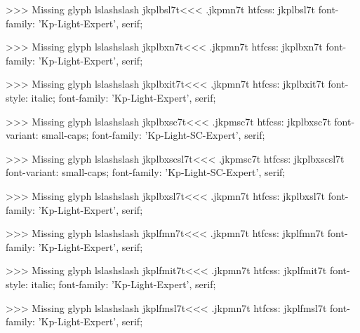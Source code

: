 >>>
Missing glyph	lslashslash
\<jkplbsl7t\><<<
.jkpmn7t
htfcss:  jkplbsl7t  font-family: 'Kp-Light-Expert', serif;

>>>
Missing glyph	lslashslash
\<jkplbxn7t\><<<
.jkpmn7t
htfcss:  jkplbxn7t  font-family: 'Kp-Light-Expert', serif;

>>>
Missing glyph	lslashslash
\<jkplbxit7t\><<<
.jkpmn7t
htfcss:  jkplbxit7t  font-style: italic; font-family: 'Kp-Light-Expert', serif;

>>>
Missing glyph	lslashslash
\<jkplbxsc7t\><<<
.jkpmsc7t
htfcss:  jkplbxsc7t  font-variant: small-caps; font-family: 'Kp-Light-SC-Expert', serif;

>>>
Missing glyph	lslashslash
\<jkplbxscsl7t\><<<
.jkpmsc7t
htfcss:  jkplbxscsl7t  font-variant: small-caps; font-family: 'Kp-Light-SC-Expert', serif;

>>>
Missing glyph	lslashslash
\<jkplbxsl7t\><<<
.jkpmn7t
htfcss:  jkplbxsl7t  font-family: 'Kp-Light-Expert', serif;

>>>
Missing glyph	lslashslash
\<jkplfmn7t\><<<
.jkpmn7t
htfcss:  jkplfmn7t  font-family: 'Kp-Light-Expert', serif;

>>>
Missing glyph	lslashslash
\<jkplfmit7t\><<<
.jkpmn7t
htfcss:  jkplfmit7t  font-style: italic; font-family: 'Kp-Light-Expert', serif;

>>>
Missing glyph	lslashslash
\<jkplfmsl7t\><<<
.jkpmn7t
htfcss:  jkplfmsl7t  font-family: 'Kp-Light-Expert', serif;

